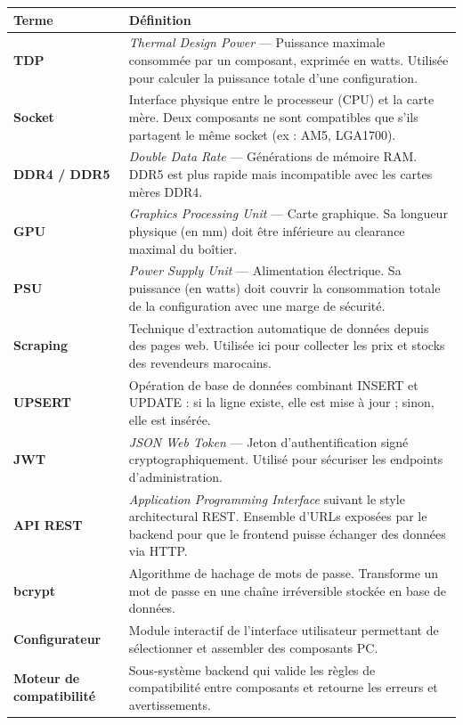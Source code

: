 \documentclass[12pt,a4paper]{article}
\begin{document}
\begin{longtable}{>{\bfseries}p{3.5cm} p{10cm}}
\toprule
\textbf{Terme} & \textbf{Définition} \\
\midrule
\endhead
TDP &
\textit{Thermal Design Power} — Puissance maximale consommée par un composant, exprimée en watts. Utilisée pour calculer la puissance totale d'une configuration. \\
\midrule
Socket &
Interface physique entre le processeur (CPU) et la carte mère. Deux composants ne sont compatibles que s'ils partagent le même socket (ex : AM5, LGA1700). \\
\midrule
DDR4 / DDR5 &
\textit{Double Data Rate} — Générations de mémoire RAM. DDR5 est plus rapide mais incompatible avec les cartes mères DDR4. \\
\midrule
GPU &
\textit{Graphics Processing Unit} — Carte graphique. Sa longueur physique (en mm) doit être inférieure au clearance maximal du boîtier. \\
\midrule
PSU &
\textit{Power Supply Unit} — Alimentation électrique. Sa puissance (en watts) doit couvrir la consommation totale de la configuration avec une marge de sécurité. \\
\midrule
Scraping &
Technique d'extraction automatique de données depuis des pages web. Utilisée ici pour collecter les prix et stocks des revendeurs marocains. \\
\midrule
UPSERT &
Opération de base de données combinant INSERT et UPDATE : si la ligne existe, elle est mise à jour ; sinon, elle est insérée. \\
\midrule
JWT &
\textit{JSON Web Token} — Jeton d'authentification signé cryptographiquement. Utilisé pour sécuriser les endpoints d'administration. \\
\midrule
API REST &
\textit{Application Programming Interface} suivant le style architectural REST. Ensemble d'URLs exposées par le backend pour que le frontend puisse échanger des données via HTTP. \\
\midrule
bcrypt &
Algorithme de hachage de mots de passe. Transforme un mot de passe en une chaîne irréversible stockée en base de données. \\
\midrule
Configurateur &
Module interactif de l'interface utilisateur permettant de sélectionner et assembler des composants PC. \\
\midrule
Moteur de compatibilité &
Sous-système backend qui valide les règles de compatibilité entre composants et retourne les erreurs et avertissements. \\
\bottomrule
\end{longtable}
\end{document}
